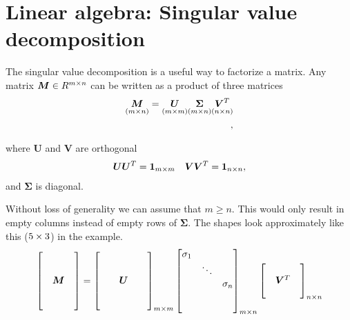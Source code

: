 \chapter{Linear algebra: Singular value decomposition}
The singular value decomposition is a useful way to factorize a matrix. 
Any matrix $\bm{M} \in R^{m \times n}$ can be written as a product of three matrices
\begin{align}
    \underset{(m \times n)}{\bm{M}}  = \underset{(m \times m)}{\bm{U}}\underset{(m \times n)}{\bm{\Sigma}} \underset{(n \times n)}{\bm{V}^T}\\,
\end{align}

where $\bm{U}$ and $\bm{V}$ are orthogonal 
\begin{align}
    \bm{UU}^T = \bm{1}_{m \times m} && \bm{VV}^T = \bm{1}_{n \times n},
\end{align}
and $\bm{\Sigma}$ is diagonal.

Without loss of generality we can assume that $m \geq n$. This would only result in empty columns instead of empty rows of $\bm{\Sigma}$.
The shapes look approximately like this ($5 \times 3$) in the example.
\begin{align}
    \begin{bmatrix}
    &        & \\
    &        & \\
    & \bm{M} & \\
    &        & \\
    &        & 
    \end{bmatrix}    = 
    \begin{bmatrix}
    & &        & & \\
    & &        & & \\
    & & \bm{U} & & \\
    & &        & & \\
    & &        & & 
    \end{bmatrix}_{m \times m}
    \begin{bmatrix}
    \sigma_1 &        &          \\
             & \ddots &          \\
             &        & \sigma_n \\
             &        &          \\
             &        &          
    \end{bmatrix}_{m \times n}
    \begin{bmatrix}
        &          & \\
        & \bm{V}^T & \\
        &          &  
    \end{bmatrix}_{n \times n}
\end{align}

